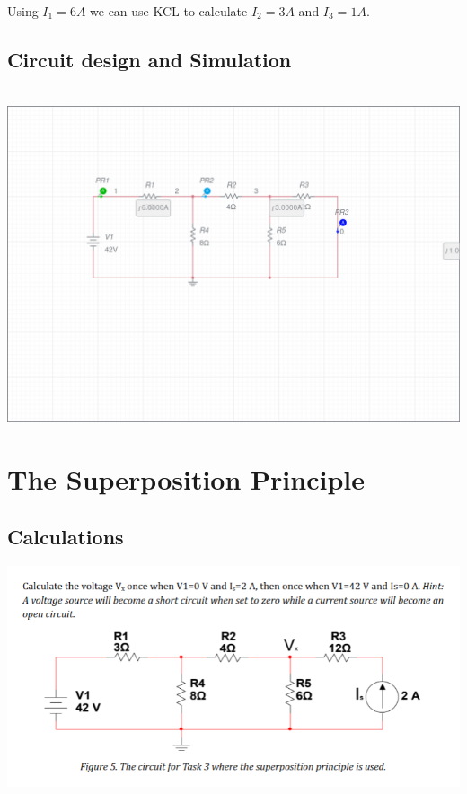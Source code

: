 \documentclass[11pt]{article}
\begin{document}
\noindent
\\
Using $I_{1} = 6A$ we can use KCL to calculate $I_{2} = 3A$ and $I_{3} = 1A$.  

\subsection[25pt]{\bf{Circuit design and Simulation}}

\noindent
\\
\includegraphics[width=\linewidth]{circuits/Lab 1 Task 2-schematic.png}


\section{\bf{The Superposition Principle}}

\subsection[25pt]{\bf{Calculations}}

\includegraphics[width=\linewidth]{3.1 calculations.png}
\end{document}
